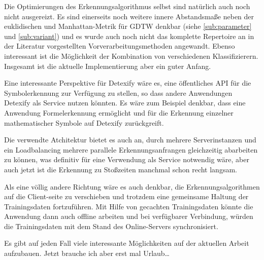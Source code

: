 Die Optimierungen des Erkennungsalgorithmus selbst sind natürlich auch noch nicht ausgereizt. Es sind einerseits noch weitere innere Abstandsmaße neben der euklidischen und Manhattan-Metrik für GDTW denkbar (siehe \ref{sub:parameter} und \ref{sub:variant}) und es wurde auch noch nicht das komplette Repertoire an in der Literatur vorgestellten Vorverarbeitungsmethoden angewandt. Ebenso interessant ist die Möglichkeit der Kombination von verschiedenen Klassifizierern. Insgesamt ist die aktuelle Implementierung aber ein guter Anfang.

Eine interessante Perspektive für Detexify wäre es, eine öffentliches \ac{API} für die Symbolerkennung zur Verfügung zu stellen, so dass andere Anwendungen Detexify als Service nutzen könnten. Es wäre zum Beispiel denkbar, dass eine Anwendung Formelerkennung ermöglicht und für die Erkennung einzelner mathematischer Symbole auf Detexify zurückgreift. %

Die verwendte Atchitektur bietet es auch an, durch mehrere Serverinstanzen und ein Loadbalancing mehrere parallele Erkennungsanfrangen gleichzeitig abarbeiten zu können, was definitiv für eine Verwendung als Service notwendig wäre, aber auch jetzt ist die Erkennung zu Stoßzeiten manchmal schon recht langsam.

Als eine völlig andere Richtung wäre es auch denkbar, die Erkennungsalgorithmen auf die Client-seite zu verschieben und trotzdem eine gemeinsame Haltung der Trainingsdaten fortzuführen. Mit Hilfe von gecachten Trainingsdaten könnte die Anwendung dann auch offline arbeiten und bei verfügbarer Verbindung, würden die Trainingsdaten mit dem Stand des Online-Servers synchronisiert.

Es gibt auf jeden Fall viele interessante Möglichkeiten auf der aktuellen Arbeit aufzubauen. Jetzt brauche ich aber erst mal Urlaub\dots